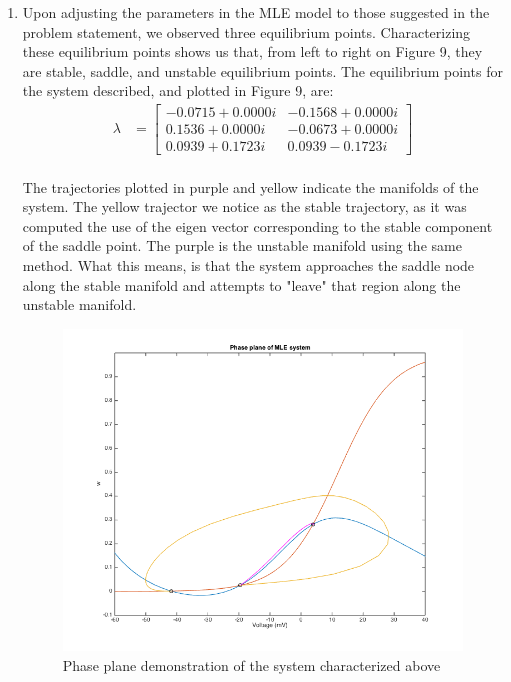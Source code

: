 \documentclass[10pt]{report}
\newcommand{\bm}{\begin{bmatrix}}
\newcommand{\bb}{\end{bmatrix}}
\begin{document}
\begin{enumerate}
\item Upon adjusting the parameters in the MLE model to those suggested in the problem statement, we observed three equilibrium points. Characterizing these equilibrium points shows us that, from left to right on Figure 9, they are stable, saddle, and unstable equilibrium points. The equilibrium points for the system described, and plotted in Figure 9, are: \begin{align*} \lambda &= \bm -0.0715 + 0.0000i & -0.1568 + 0.0000i \\ 0.1536 + 0.0000i & -0.0673 + 0.0000i \\ 0.0939 + 0.1723i  & 0.0939 - 0.1723i \bb \end{align*} \\The trajectories plotted in purple and yellow indicate the manifolds of the system. The yellow trajector we notice as the stable trajectory, as it was computed the use of the eigen vector corresponding to the stable component of the saddle point. The purple is the unstable manifold using the same method. What this means, is that the system approaches the saddle node along the stable manifold and attempts to "leave" that region along the unstable manifold. \begin{figure}[h!] \includegraphics[scale=0.5]{motnq11.png} \caption[h9]{Phase plane demonstration of the system characterized above} \end{figure}
%
%

\end{enumerate}
\end{document}
